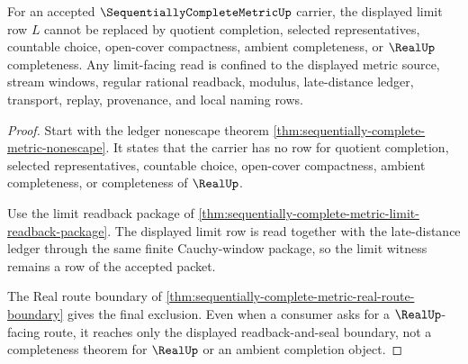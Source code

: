 \begin{theorem}
\label{thm:sequentially-complete-metric-limit-nonescape}
For an accepted $\SequentiallyCompleteMetricUp$ carrier, the displayed limit row $L$ cannot be replaced by quotient completion, selected representatives, countable choice, open-cover compactness, ambient completeness, or $\RealUp$ completeness. Any limit-facing read is confined to the displayed metric source, stream windows, regular rational readback, modulus, late-distance ledger, transport, replay, provenance, and local naming rows.
\end{theorem}
\begin{proof}
Start with the ledger nonescape theorem \autoref{thm:sequentially-complete-metric-nonescape}. It states that the carrier has no row for quotient completion, selected representatives, countable choice, open-cover compactness, ambient completeness, or completeness of $\RealUp$.

Use the limit readback package of \autoref{thm:sequentially-complete-metric-limit-readback-package}. The displayed limit row is read together with the late-distance ledger through the same finite Cauchy-window package, so the limit witness remains a row of the accepted packet.

The Real route boundary of \autoref{thm:sequentially-complete-metric-real-route-boundary} gives the final exclusion. Even when a consumer asks for a $\RealUp$-facing route, it reaches only the displayed readback-and-seal boundary, not a completeness theorem for $\RealUp$ or an ambient completion object.
\end{proof}


